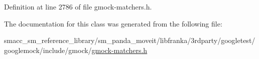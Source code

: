Definition at line 2786 of file gmock-\/matchers.\+h.



The documentation for this class was generated from the following file\+:\begin{DoxyCompactItemize}
\item 
smacc\+\_\+sm\+\_\+reference\+\_\+library/sm\+\_\+panda\+\_\+moveit/libfranka/3rdparty/googletest/googlemock/include/gmock/\hyperlink{gmock-matchers_8h}{gmock-\/matchers.\+h}\end{DoxyCompactItemize}
